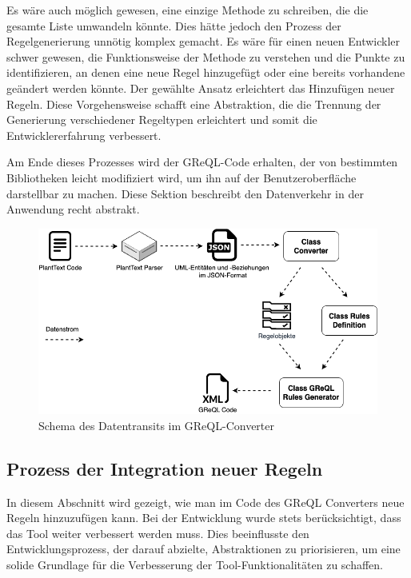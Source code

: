 Es wäre auch möglich gewesen, eine einzige Methode zu schreiben, die die gesamte Liste umwandeln könnte. Dies hätte
jedoch den Prozess der Regelgenerierung unnötig komplex gemacht. Es wäre für einen neuen Entwickler schwer gewesen, die
Funktionsweise der Methode zu verstehen und die Punkte zu identifizieren, an denen eine neue Regel hinzugefügt oder
eine bereits vorhandene geändert werden könnte. Der gewählte Ansatz erleichtert das Hinzufügen neuer Regeln. Diese
Vorgehensweise schafft eine Abstraktion, die die Trennung der Generierung verschiedener Regeltypen erleichtert und somit
die Entwicklererfahrung verbessert.

Am Ende dieses Prozesses wird der GReQL-Code erhalten, der von bestimmten Bibliotheken leicht modifiziert wird, um ihn
auf der Benutzeroberfläche darstellbar zu machen. Diese Sektion beschreibt den Datenverkehr in der Anwendung recht
abstrakt.

\begin{figure}[h!]
    \centering
    \includegraphics[width=12cm]{images/transit}
    \caption{Schema des Datentransits im GReQL-Converter}
    \label{fig:transit}
\end{figure}

\subsection{Prozess der Integration neuer Regeln}

In diesem Abschnitt wird gezeigt, wie man im Code des GReQL Converters neue Regeln hinzuzufügen kann. Bei der Entwicklung
wurde stets berücksichtigt, dass das Tool weiter verbessert werden muss. Dies beeinflusste den Entwicklungsprozess,
der darauf abzielte, Abstraktionen zu priorisieren, um eine solide Grundlage für die Verbesserung der
Tool-Funktionalitäten zu schaffen.

